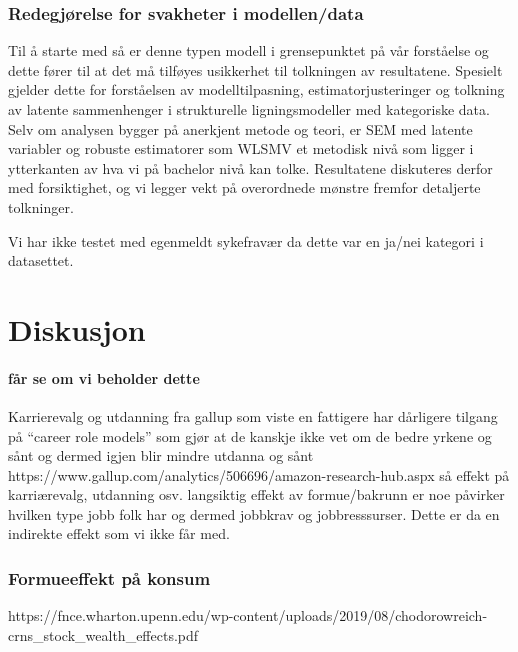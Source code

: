\documentclass[
  12pt,
  a4paper,
  DIV=11,
  numbers=noendperiod]{scrartcl}
\let\oldparagraph\paragraph
\renewcommand{\paragraph}[1]{\oldparagraph{#1}\mbox{}}
\begin{document}
\subsubsection{Redegjørelse for svakheter i
modellen/data}\label{redegjuxf8relse-for-svakheter-i-modellendata}

Til å starte med så er denne typen modell i grensepunktet på vår
forståelse og dette fører til at det må tilføyes usikkerhet til
tolkningen av resultatene. Spesielt gjelder dette for forståelsen av
modelltilpasning, estimatorjusteringer og tolkning av latente
sammenhenger i strukturelle ligningsmodeller med kategoriske data. Selv
om analysen bygger på anerkjent metode og teori, er SEM med latente
variabler og robuste estimatorer som WLSMV et metodisk nivå som ligger i
ytterkanten av hva vi på bachelor nivå kan tolke. Resultatene diskuteres
derfor med forsiktighet, og vi legger vekt på overordnede mønstre
fremfor detaljerte tolkninger.

Vi har ikke testet med egenmeldt sykefravær da dette var en ja/nei
kategori i datasettet.

\newpage

\section{Diskusjon}\label{diskusjon}

\paragraph{får se om vi beholder
dette}\label{fuxe5r-se-om-vi-beholder-dette}

Karrierevalg og utdanning fra gallup som viste en fattigere har
dårligere tilgang på ``career role models'' som gjør at de kanskje ikke
vet om de bedre yrkene og sånt og dermed igjen blir mindre utdanna og
sånt https://www.gallup.com/analytics/506696/amazon-research-hub.aspx så
effekt på karriærevalg, utdanning osv. langsiktig effekt av
formue/bakrunn er noe påvirker hvilken type jobb folk har og dermed
jobbkrav og jobbresssurser. Dette er da en indirekte effekt som vi ikke
får med.

\subsubsection{Formueeffekt på konsum}\label{formueeffekt-puxe5-konsum}

https://fnce.wharton.upenn.edu/wp-content/uploads/2019/08/chodorowreich-crns\_stock\_wealth\_effects.pdf
\end{document}
